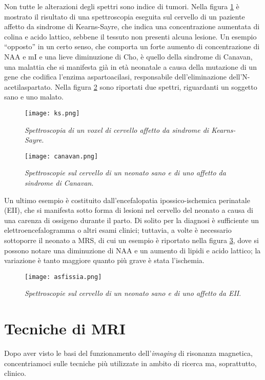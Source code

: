 \documentclass{report}
\newcommand{\virgolette}[1]{``#1''}
\newcommand{\figref}[1]{figura \ref{#1}}
\numberwithin{equation}{section}
\numberwithin{figure}{section}
\begin{document}
Non tutte le alterazioni degli spettri sono indice di tumori. Nella \figref{fig:ks} è mostrato il risultato di una spettroscopia eseguita sul cervello di un paziente affetto da sindrome di Kearns-Sayre, che indica una concentrazione aumentata di colina e acido lattico, sebbene il tessuto non presenti alcuna lesione. Un esempio \virgolette{opposto} in un certo senso, che comporta un forte aumento di concentrazione di NAA e mI e una lieve diminuzione di Cho, è quello della sindrome di Canavan, una malattia che si manifesta già in età neonatale a causa della mutazione di un gene che codifica l'enzima aspartoacilasi, responsabile dell'eliminazione dell'N-acetilaspartato. Nella \figref{fig:canavan} sono riportati due spettri, riguardanti un soggetto sano e uno malato.

\begin{figure}[htp]
\centering
\texttt{[image: ks.png]}
\caption{\label{fig:ks} \textit{Spettroscopia di un voxel di cervello affetto da sindrome di Kearns-Sayre}.}
\end{figure}

\vspace{-10 pt}

\begin{figure}[htp]
\centering
\texttt{[image: canavan.png]}
\caption{\label{fig:canavan} \textit{Spettroscopie sul cervello di un neonato sano e di uno affetto da sindrome di Canavan}.}
\end{figure}

\noindent Un ultimo esempio è costituito dall'encefalopatia ipossico-ischemica perinatale (EII), che si manifesta sotto forma di lesioni nel cervello del neonato a causa di una carenza di ossigeno durante il parto. Di solito per la diagnosi è sufficiente un elettroencefalogramma o altri esami clinici; tuttavia, a volte è necessario sottoporre il neonato a MRS, di cui un esempio è riportato nella \figref{fig:asfissia}, dove si possono notare una diminuzione di NAA e un aumento di lipidi e acido lattico; la variazione è tanto maggiore quanto più grave è stata l'ischemia.

\begin{figure}[htp]
\centering
\texttt{[image: asfissia.png]}
\caption{\label{fig:asfissia} \textit{Spettroscopie sul cervello di un neonato sano e di uno affetto da EII}.}
\end{figure}

\section{Tecniche di MRI}
Dopo aver visto le basi del funzionamento dell'\textit{imaging} di risonanza magnetica, concentriamoci sulle tecniche più utilizzate in ambito di ricerca ma, soprattutto, clinico. 
\end{document}
